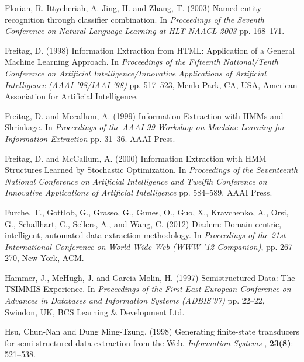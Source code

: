 \documentclass{nle}
\begin{document}
\begin{thebibliography}{}
Florian, R. Ittycheriah, A. Jing, H. and Zhang, T. (2003)
Named entity recognition through classifier combination.
In {\it Proceedings of the Seventh Conference on Natural Language Learning at HLT-NAACL 2003}
pp. 168--171.

Freitag, D. (1998)
Information Extraction from HTML: Application of a General Machine Learning Approach.
In {\it Proceedings of the Fifteenth National/Tenth Conference on Artificial Intelligence/Innovative Applications of Artificial Intelligence (AAAI '98/IAAI '98)}
pp. 517--523, Menlo Park, CA, USA, American Association for Artificial Intelligence.

Freitag, D. and Mccallum, A. (1999)
Information Extraction with HMMs and Shrinkage.
In {\it Proceedings of the AAAI-99 Workshop on Machine Learning for Information Extraction}
pp. 31--36. AAAI Press.

Freitag, D. and McCallum, A. (2000)
Information Extraction with HMM Structures Learned by Stochastic Optimization.
In {\it Proceedings of the Seventeenth National Conference on Artificial Intelligence and Twelfth Conference on Innovative Applications of Artificial Intelligence}
pp. 584--589. AAAI Press.

Furche, T., Gottlob, G., Grasso, G., Gunes, O., Guo, X., Kravchenko, A., Orsi, G., Schallhart, C., Sellers, A., and Wang, C. (2012)
Diadem: Domain-centric, intelligent, automated data extraction methodology.
In {\it Proceedings of the 21st International Conference on World Wide Web (WWW '12 Companion)}, 
pp. 267--270, New York, ACM.

Hammer, J., McHugh, J. and Garcia-Molin, H. (1997)
Semistructured Data: The TSIMMIS Experience.
In {\it Proceedings of the First East-European Conference on Advances in Databases and Information Systems (ADBIS'97)}
pp. 22--22, Swindon, UK, BCS Learning \& Development Ltd.

Hsu, Chun-Nan and Dung Ming-Tzung. (1998) 
Generating finite-state transducers for semi-structured data extraction from the Web.
{\it Information Systems \/}, 
{\bf 23(8)}: 521--538.


\end{thebibliography}
\end{document}
